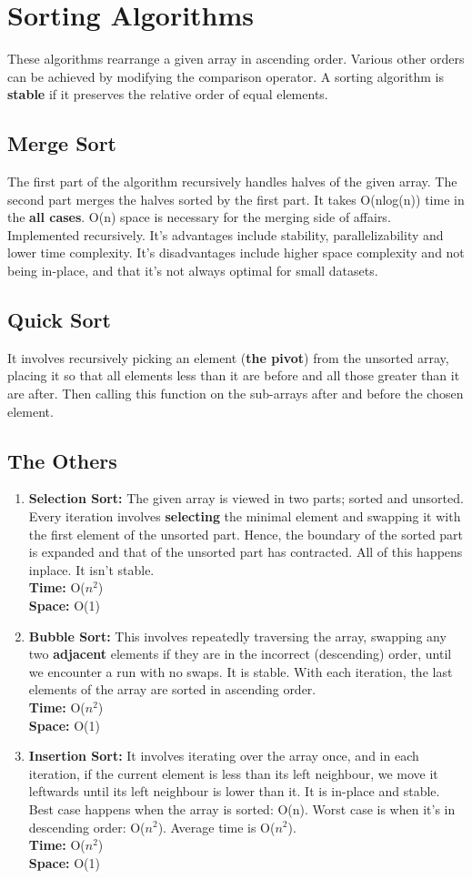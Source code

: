 \documentclass{report}
\newcommand*{\algodis}[4]{
    \textbf{#1:} #2\\%
    \textbf{Time:} #3 \\%
    \textbf{Space:} #4
}
\begin{document}
\section{Sorting Algorithms}
These algorithms rearrange a given array in ascending order.
Various other orders can be achieved by modifying the comparison operator.
A sorting algorithm is \textbf{stable} if it preserves the relative
order of equal elements.
\subsection*{Merge Sort}
The first part of the algorithm recursively handles halves of the given array.
The second part merges the halves sorted by the first part.
It takes O(nlog(n)) time in the \textbf{all cases}. O(n) space is necessary
for the merging side of affairs. Implemented recursively. It's advantages
include stability, parallelizability and lower time complexity. It's disadvantages
include higher space complexity and not being in-place, and that it's not
always optimal for small datasets. 
\subsection*{Quick Sort}
It involves recursively picking an element (\textbf{the pivot})
from the unsorted array, 
placing it so that all elements less than it are before and all
those greater than it are after. Then calling this function on the sub-arrays
after and before the chosen element.

\subsection*{The Others}
\begin{enumerate}
    \item \algodis{Selection Sort}
    {The given array is viewed in two parts; sorted and unsorted.
    Every iteration involves \textbf{selecting} the minimal element
    and swapping it with the first element of the unsorted part. Hence,
    the boundary of the sorted part is expanded and that of the unsorted
    part has contracted. All of this happens inplace. It isn't stable.}
    {O($n^2$)}{O(1)}
    \item \algodis{Bubble Sort}
    {This involves repeatedly traversing the array,
    swapping any two \textbf{adjacent} elements if they are
    in the incorrect (descending) order, until we encounter
    a run with no swaps. It is stable. With each iteration,
    the last elements of the array are sorted in ascending order.}
    {O($n^2$)}
    {O(1)}
    \item \algodis{Insertion Sort}
    {It involves iterating over the array once, and in each iteration,
    if the current element is less than its left neighbour, we move it
    leftwards until its left neighbour is lower than it. It is in-place
    and stable. Best case happens when the array is sorted: O(n). Worst case
    is when it's in descending order: O($n^2$). Average time is O($n^2$).}
    {O($n^2$)}{O(1)}
\end{enumerate}
\end{document}
